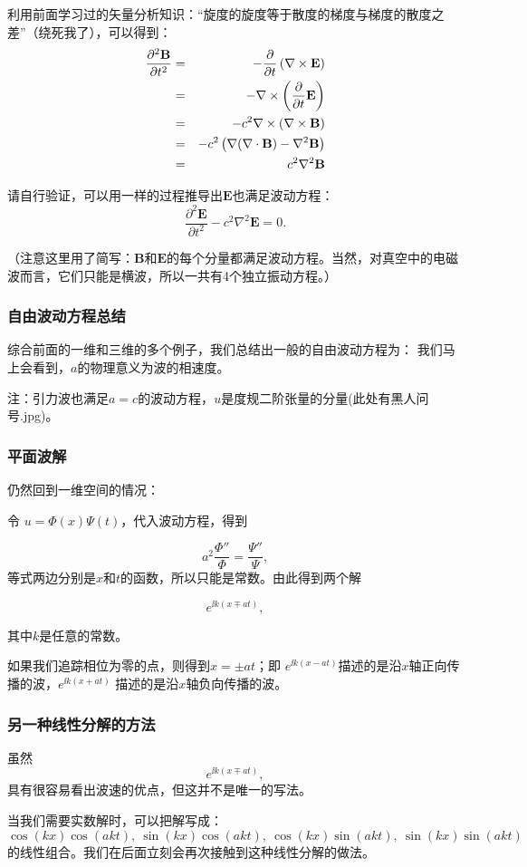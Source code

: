 \documentclass[CJK]{beamer}
\begin{document}
\begin{frame}
  利用前面学习过的矢量分析知识：“旋度的旋度等于散度的梯度与梯度的散度之差”（绕死我了），可以得到：
  \begin{eqnarray}
    \frac{\partial^2 \mathbf{B}}{\partial t^2}
    &=& -\frac{\partial}{\partial t}\left(\nabla\times\mathbf{E}\right) \nonumber \\
    &=& -\nabla\times\left(\frac{\partial}{\partial t}\mathbf{E}\right) \nonumber \\     
    &=& -c^2\nabla\times(\nabla\times \mathbf{B}) \nonumber \\
    &=& -c^2\left(\nabla(\nabla\cdot\mathbf{B}) -\nabla^2\mathbf{B}\right) \nonumber \\
    &=& c^2\nabla^2\mathbf{B}\nonumber
  \end{eqnarray}

  请自行验证，可以用一样的过程推导出$\mathbf{E}$也满足波动方程：
  $$\frac{\partial^2 \mathbf{E}}{\partial t^2}-c^2\nabla^2\mathbf{E}=0.$$

  （注意这里用了简写：$\mathbf{B}$和$\mathbf{E}$的每个分量都满足波动方程。当然，对真空中的电磁波而言，它们只能是横波，所以一共有4个独立振动方程。）
\end{frame}


\begin{frame}
\frametitle{自由波动方程总结}

综合前面的一维和三维的多个例子，我们总结出一般的自由波动方程为：
我们马上会看到，$a$的物理意义为波的相速度。

\skiplines

{\scriptsize 注：引力波也满足$a=c$的波动方程，$u$是度规二阶张量的分量(此处有黑人问号.jpg)。}


\end{frame}


\begin{frame}
\frametitle{平面波解}
仍然回到一维空间的情况：

令 $u = \Phi(x)\Psi(t)$，代入波动方程，得到

$$ a^2\frac{\Phi'' }{\Phi} =  \frac{\Psi''}{\Psi}, $$
等式两边分别是$x$和$t$的函数，所以只能是常数。由此得到两个解

$$ e^{\ii k(x\mp at)}, $$

其中$k$是任意的常数。

如果我们追踪相位为零的点，则得到$x = \pm at$；即 $e^{\ii k(x - at)}$描述的是沿$x$轴正向传播的波，$e^{\ii k(x + at)}$ 描述的是沿$x$轴负向传播的波。

\end{frame}


\begin{frame}
\frametitle{另一种线性分解的方法}

虽然
$$ e^{\ii k(x\mp at)}, $$
具有很容易看出波速的优点，但这并不是唯一的写法。

\skiplines

当我们需要实数解时，可以把解写成：
$$ \cos (kx)\cos(akt),\ \sin(kx)\cos(akt),\ \cos(kx)\sin(akt),\ \sin(kx)\sin(akt)$$
的线性组合。我们在后面立刻会再次接触到这种线性分解的做法。

\end{frame}
\end{document}

